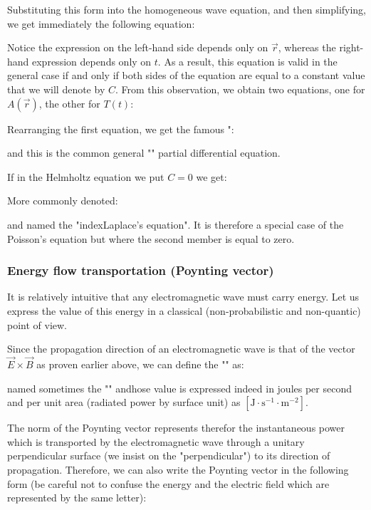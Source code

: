 	Substituting this form into the homogeneous wave equation, and then simplifying, we get immediately the following equation:
	
	Notice the expression on the left-hand side depends only on $\vec{r}$, whereas the right-hand expression depends only on $t$. As a result, this equation is valid in the general case if and only if both sides of the equation are equal to a constant value that we will denote by $C$. From this observation, we obtain two equations, one for $A(\vec{r})$, the other for $T(t)$:
	
	Rearranging the first equation, we get the famous ":
	
	and this is the common general "" partial differential equation.
	\begin{tcolorbox}[title=Remark,colframe=black,arc=10pt]
	If in the Helmholtz equation we put $C=0$ we get:
	
	More commonly denoted:
	
	and named the "index{Laplace's equation}". It is therefore a special case of the Poisson's equation but where the second member is equal to zero.
	\end{tcolorbox}
	
	
	\subsubsection{Energy flow transportation (Poynting vector)}\label{poynting vector}
	It is relatively intuitive that any electromagnetic wave must carry energy. Let us express the value of this energy in a classical (non-probabilistic and non-quantic) point of view.

	Since the propagation direction of an electromagnetic wave is that of the vector $\vec{E}\times\vec{B}$ as proven earlier above, we can define the "" as:
	
	named sometimes the "" andhose value is expressed indeed in joules per second and per unit area (radiated power by surface unit) as $[\text{J}\cdot\text{s}^{-1}\cdot\text{m}^{-2}]$.

	The norm of the Poynting vector represents therefor the instantaneous power which is transported by the electromagnetic wave through a unitary perpendicular surface (we insist on the "perpendicular") to its direction of propagation. Therefore, we can also write the Poynting vector in the following form (be careful not to confuse the energy and the electric field which are represented by the same letter):
	
